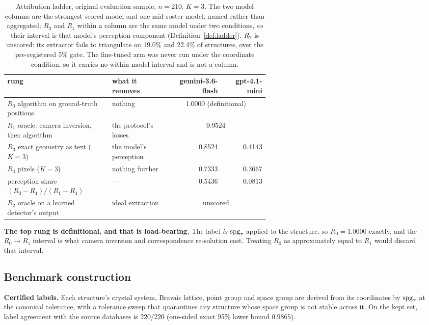 \begin{table}[t]
\centering
\caption{Attribution ladder, original evaluation sample, $n=210$, $K{=}3$. The two model columns are the
strongest scored model and one mid-roster model, named rather than aggregated; $R_3$ and $R_4$ within
a column are the same model under two conditions, so their interval is that model's perception component
(Definition~\ref{def:ladder}). $R_2$ is unscored: its extractor fails to triangulate on 19.0\% and 22.4\%
of structures, over the pre-registered 5\% gate. The fine-tuned arm was never run under the coordinate
condition, so it carries no within-model interval and is not a column.}
\label{tab:rungs}
\small
\setlength{\tabcolsep}{4.5pt}
\begin{tabular}{p{0.40\linewidth}p{0.22\linewidth}rr}
\toprule
rung & what it removes & \small gemini-3.6-flash & \small gpt-4.1-mini \\
\midrule
$R_0$ algorithm on ground-truth positions & nothing & \multicolumn{2}{c}{1.0000 (definitional)} \\
$R_1$ oracle: camera inversion, then algorithm & the protocol's losses & \multicolumn{2}{c}{0.9524} \\
$R_3$ exact geometry as text ($K{=}3$) & the model's perception & 0.8524 & 0.4143 \\
$R_4$ pixels ($K{=}3$) & nothing further & 0.7333 & 0.3667 \\
\midrule
perception share $(R_3-R_4)/(R_1-R_4)$ & --- & 0.5436 & 0.0813 \\
$R_2$ oracle on a learned detector's output & ideal extraction & \multicolumn{2}{c}{unscored} \\
\bottomrule
\end{tabular}
\end{table}

\textbf{The top rung is definitional, and that is load-bearing.} The label \emph{is} $\mathrm{spg}_\tau$ applied to the
structure, so $R_0 = 1.0000$ exactly, and the $R_0 \to R_1$ interval is what camera inversion and
correspondence re-solution cost. Treating $R_0$ as approximately equal to $R_1$ would discard that
interval.

\subsection{Benchmark construction}
\label{sec:benchmark}

\textbf{Certified labels.} Each structure's crystal system, Bravais lattice, point group and space group
are derived from its coordinates by $\mathrm{spg}_\tau$ at the canonical tolerance, with a tolerance sweep that
quarantines any structure whose space group is not stable across it. On the kept set, label agreement with
the source databases is $220/220$ (one-sided exact 95\% lower bound $0.9865$).

